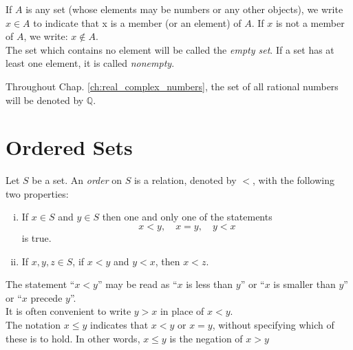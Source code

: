 \begin{definition}
  If $A$ is any set (whose elements may be numbers or any other objects), we write $x \in A$ to indicate that x is a member 
  (or an element) of $A$.\newline
   If $x$ is not a member of $A$, we write: $x \notin A$.\\
  \indent The set which contains no element will be called the \emph{empty set}. If a set has at least one element, it is called 
  \emph{nonempty}.\\

\end{definition}









\begin{definition}
  Throughout Chap. \ref{ch:real_complex_numbers}, the set of all rational numbers will be denoted by $\mathbb{Q}$.
\end{definition}





\section{Ordered Sets}

\begin{definition}
  Let $S$ be a set. An \emph{order} on $S$ is a relation, denoted by $<$, with the following two properties:
  \begin{enumerate}[(i)]
    \item If $x \in S$ and $y \in S$ then one and only one of the statements 
    \begin{equation*}
    x < y,\quad x = y,\quad y < x  
    \end{equation*}
    is true.
    \item If $x,y,z \in S$, if $x<y$ and $y<x$, then $x<z$.
  \end{enumerate}
  The statement ``$x < y$'' may be read as ``$x$ is less than $y$'' or ``$x$ is smaller than $y$'' or ``$x$ precede $y$''.\\
    \indent It is often convenient to write $y > x$ in place of $x < y$.\\
    \indent The notation $x \leq y$ indicates that $x < y$ or $x = y$, without specifying which of these is to hold. In other words,
    $x \leq y$ is the negation of $x>y$
\end{definition}

